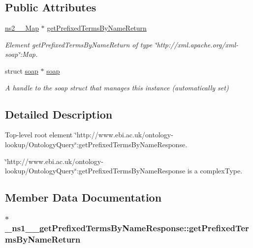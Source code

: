 \subsection*{Public Attributes}
\begin{DoxyCompactItemize}
\item 
\hyperlink{classns2____Map}{ns2\_\-\_\-Map} $\ast$ \hyperlink{class__ns1____getPrefixedTermsByNameResponse_ac76f1213046b0953b60b552dabf710a1}{getPrefixedTermsByNameReturn}
\begin{DoxyCompactList}\small\item\em Element getPrefixedTermsByNameReturn of type \char`\"{}http://xml.apache.org/xml-\/soap\char`\"{}:Map. \end{DoxyCompactList}\item 
\hypertarget{class__ns1____getPrefixedTermsByNameResponse_a266f21650bc3a274d2bc203be072648e}{
struct \hyperlink{class__ns1____getPrefixedTermsByNameResponse_a266f21650bc3a274d2bc203be072648e}{soap} $\ast$ \hyperlink{class__ns1____getPrefixedTermsByNameResponse_a266f21650bc3a274d2bc203be072648e}{soap}}
\label{class__ns1____getPrefixedTermsByNameResponse_a266f21650bc3a274d2bc203be072648e}

\begin{DoxyCompactList}\small\item\em A handle to the soap struct that manages this instance (automatically set) \end{DoxyCompactList}\end{DoxyCompactItemize}


\subsection{Detailed Description}
Top-\/level root element \char`\"{}http://www.ebi.ac.uk/ontology-\/lookup/OntologyQuery\char`\"{}:getPrefixedTermsByNameResponse. 

\char`\"{}http://www.ebi.ac.uk/ontology-\/lookup/OntologyQuery\char`\"{}:getPrefixedTermsByNameResponse is a complexType. 

\subsection{Member Data Documentation}
\hypertarget{class__ns1____getPrefixedTermsByNameResponse_ac76f1213046b0953b60b552dabf710a1}{
\subsubsection[{getPrefixedTermsByNameReturn}]{ $\ast$ {\bf \_\-ns1\_\-\_\-getPrefixedTermsByNameResponse::getPrefixedTermsByNameReturn}}}
\label{class__ns1____getPrefixedTermsByNameResponse_ac76f1213046b0953b60b552dabf710a1}


